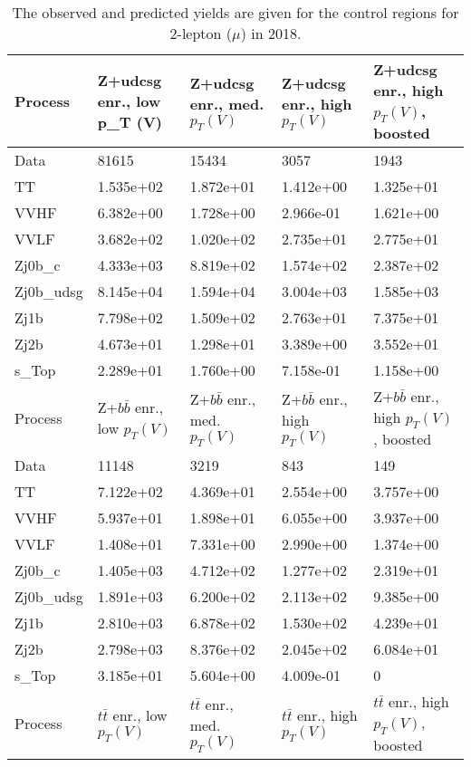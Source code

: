 \begin{table}
\centering
\caption[2018 2-lepton ($\mu$) control region yields]{
                  The observed and predicted yields are given for the
                  control regions for 2-lepton ($\mu$) in 2018.
                  }
{\footnotesize
\begin{tabularx}{\textwidth}{|X|X|X|X|X|}
\hline
Process & Z+udcsg enr., low p_{T} (V) & Z+udcsg enr., med. $p_{T}(V)$ & Z+udcsg enr., high $p_{T}(V)$ & Z+udcsg enr., high $p_{T}(V)$, boosted \\
\hline
Data & 81615 & 15434 & 3057 & 1943 \\
\hline
TT & 1.535e+02 & 1.872e+01 & 1.412e+00 & 1.325e+01 \\
VVHF & 6.382e+00 & 1.728e+00 & 2.966e-01 & 1.621e+00 \\
VVLF & 3.682e+02 & 1.020e+02 & 2.735e+01 & 2.775e+01 \\
Zj0b\_c & 4.333e+03 & 8.819e+02 & 1.574e+02 & 2.387e+02 \\
Zj0b\_udsg & 8.145e+04 & 1.594e+04 & 3.004e+03 & 1.585e+03 \\
Zj1b & 7.798e+02 & 1.509e+02 & 2.763e+01 & 7.375e+01 \\
Zj2b & 4.673e+01 & 1.298e+01 & 3.389e+00 & 3.552e+01 \\
s\_Top & 2.289e+01 & 1.760e+00 & 7.158e-01 & 1.158e+00 \\
\hline
\hline
Process & Z+$b\bar{b}$ enr., low $p_{T}(V)$ & Z+$b\bar{b}$ enr., med. $p_{T}(V)$ & Z+$b\bar{b}$ enr., high $p_{T}(V)$ & Z+$b\bar{b}$ enr., high $p_{T}(V)$, boosted \\
\hline
Data & 11148 & 3219 & 843 & 149 \\
\hline
TT & 7.122e+02 & 4.369e+01 & 2.554e+00 & 3.757e+00 \\
VVHF & 5.937e+01 & 1.898e+01 & 6.055e+00 & 3.937e+00 \\
VVLF & 1.408e+01 & 7.331e+00 & 2.990e+00 & 1.374e+00 \\
Zj0b\_c & 1.405e+03 & 4.712e+02 & 1.277e+02 & 2.319e+01 \\
Zj0b\_udsg & 1.891e+03 & 6.200e+02 & 2.113e+02 & 9.385e+00 \\
Zj1b & 2.810e+03 & 6.878e+02 & 1.530e+02 & 4.239e+01 \\
Zj2b & 2.798e+03 & 8.376e+02 & 2.045e+02 & 6.084e+01 \\
s\_Top & 3.185e+01 & 5.604e+00 & 4.009e-01 & 0 \\
\hline
\hline
Process & $t\bar{t}$ enr., low $p_{T}(V)$ & $t\bar{t}$ enr., med. $p_{T}(V)$ & $t\bar{t}$ enr., high $p_{T}(V)$ & $t\bar{t}$ enr., high $p_{T}(V)$, boosted \\

\end{tabularx}}
\end{table}
